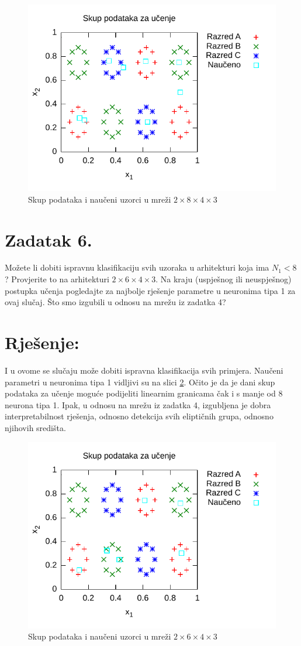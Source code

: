 \documentclass{article}
\begin{document}
\begin{figure}
    \centering
    \includegraphics{img/task5-plot.pdf}
    \caption{Skup podataka i naučeni uzorci u mreži
    $ 2 \times 8 \times 4 \times 3 $}
    \label{z5-1}
\end{figure}

\pagebreak

\section*{Zadatak 6.}
Možete li dobiti ispravnu klasifikaciju svih uzoraka u
arhitekturi koja ima $ N_1 < 8 $? Provjerite to na
arhitekturi $ 2 \times 6 \times 4 \times 3 $. Na kraju
(uspješnog ili neuspješnog) postupka učenja pogledajte za
najbolje rješenje parametre u neuronima tipa 1 za ovaj
slučaj. Što smo izgubili u odnosu na mrežu iz zadatka 4?

\section*{Rješenje:}
I u ovome se slučaju može dobiti ispravna klasifikacija svih
primjera. Naučeni parametri u neuronima tipa 1 vidljivi su na
slici \ref{z6-1}. Očito je da je dani skup podataka za učenje
moguće podijeliti linearnim granicama čak i s manje od 8
neurona tipa 1. Ipak, u odnosu na mrežu iz zadatka 4,
izgubljena je dobra interpretabilnost rješenja, odnosno
detekcija svih eliptičnih grupa, odnosno njihovih središta.

\begin{figure}
    \centering
    \includegraphics{img/task6-plot.pdf}
    \caption{Skup podataka i naučeni uzorci u mreži
    $ 2 \times 6 \times 4 \times 3 $}
    \label{z6-1}
\end{figure}
\end{document}
